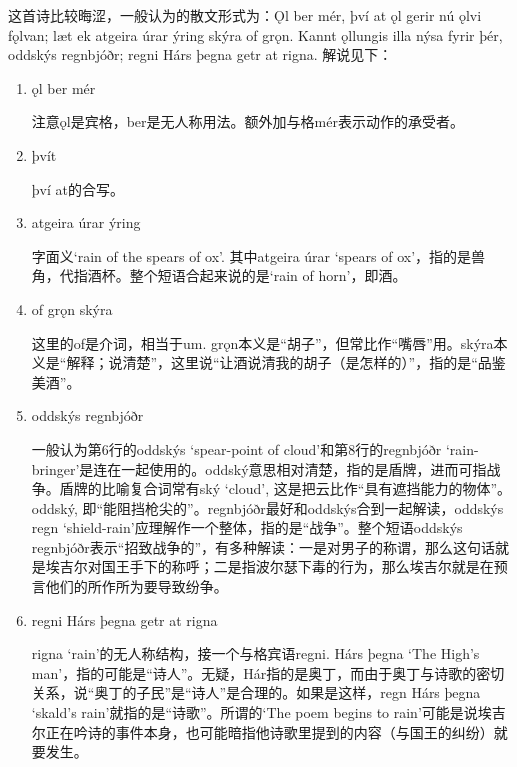 \begin{grammar*}{}
    这首诗比较晦涩，一般认为的散文形式为：Ǫl ber mér, því at ǫl gerir nú ǫlvi fǫlvan; læt ek atgeira úrar ýring
    skýra of grǫn. Kannt ǫllungis illa nýsa fyrir þér, oddskýs regnbjóðr; regni Hárs þegna getr at rigna. 解说见下：
    \begin{enumerate}[leftmargin=*]
        \item ǫl ber mér

              注意ǫl是宾格，ber是无人称用法。额外加与格mér表示动作的承受者。
        \item þvít

              því at的合写。
        \item atgeira úrar ýring

              字面义`rain of the spears of ox'. 其中atgeira úrar `spears of ox'，指的是兽角，代指酒杯。整个短语合起来说的是`rain of horn'，即酒。

        \item of grǫn skýra

              这里的of是介词，相当于um. grǫn本义是“胡子”，但常比作“嘴唇”用。skýra本义是“解释；说清楚”，这里说“让酒说清我的胡子（是怎样的）”，指的是“品鉴美酒”。

        \item oddskýs regnbjóðr

              一般认为第6行的oddskýs `spear-point of cloud'和第8行的regnbjóðr `rain-bringer'是连在一起使用的。oddský意思相对清楚，指的是盾牌，进而可指战争。盾牌的比喻复合词常有ský `cloud', 这是把云比作“具有遮挡能力的物体”。oddský, 即“能阻挡枪尖的”。regnbjóðr最好和oddskýs合到一起解读，oddskýs regn `shield-rain'应理解作一个整体，指的是“战争”。整个短语oddskýs regnbjóðr表示“招致战争的”，有多种解读：一是对男子的称谓，那么这句话就是埃吉尔对国王手下的称呼；二是指波尔瑟下毒的行为，那么埃吉尔就是在预言他们的所作所为要导致纷争。

        \item regni Hárs þegna getr at rigna

              rigna `rain'的无人称结构，接一个与格宾语regni. Hárs þegna `The High's man'，指的可能是“诗人”。无疑，Hár指的是奥丁，而由于奥丁与诗歌的密切关系，说“奥丁的子民”是“诗人”是合理的。如果是这样，regn Hárs þegna `skald's rain'就指的是“诗歌”。所谓的`The poem begins to rain'可能是说埃吉尔正在吟诗的事件本身，也可能暗指他诗歌里提到的内容（与国王的纠纷）就要发生。

    \end{enumerate}
\end{grammar*}
